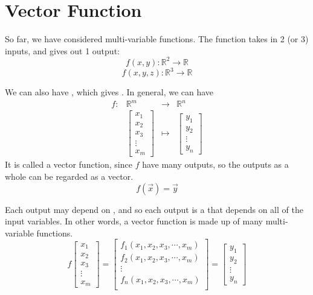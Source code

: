\section{Vector Function}

So far, we have considered multi-variable functions. The function takes in 2 (or 3) inputs, and gives out 1 output:
$$f(x, y): \mathbb{R}^2 \to \mathbb{R}$$
$$f(x, y, z): \mathbb{R}^3 \to \mathbb{R}$$

We can also have , which gives . In general, we can have $$\begin{matrix} f: &\mathbb{R}^m &\to &\mathbb{R}^n \\ &\begin{bmatrix} x_1 \\ x_2 \\ x_3 \\ \vdots \\ x_m \end{bmatrix} &\mapsto &\begin{bmatrix} y_1 \\ y_2 \\ \vdots \\ y_n \end{bmatrix} \end{matrix}$$ It is called a vector function, since $f$ have many outputs, so the outputs as a whole can be regarded as a vector. $$f(\vec{x}) = \vec{y}$$

Each output may depend on , and so each output is a  that depends on all of the input variables. In other words, a vector function is made up of many multi-variable functions. $$f\begin{bmatrix}
        x_1 \\ x_2 \\ x_3 \\ \vdots \\ x_m
    \end{bmatrix} = \begin{bmatrix}
        f_1(x_1, x_2, x_3, \cdots, x_m) \\
        f_2(x_1, x_2, x_3, \cdots, x_m) \\
        \vdots                          \\
        f_n(x_1, x_2, x_3, \cdots, x_m) \\
    \end{bmatrix} = \begin{bmatrix}
        y_1 \\ y_2 \\ \vdots \\ y_n
    \end{bmatrix}$$

